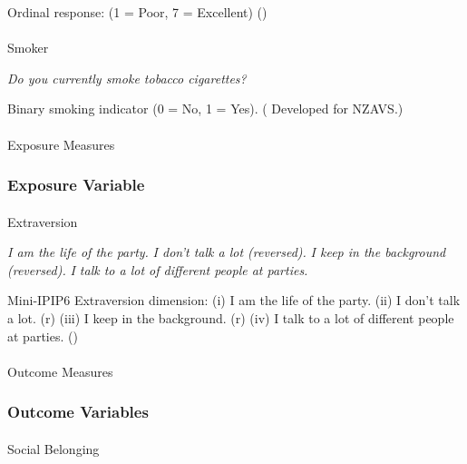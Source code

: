 \documentclass[
  single column]{article}
\makeatletter
\let\oldparagraph\paragraph
\renewcommand{\paragraph}{
    \@ifstar
      \xxxParagraphStar
      \xxxParagraphNoStar
  }
\newcommand{\xxxParagraphStar}[1]{\oldparagraph*{#1}\mbox{}}
\newcommand{\xxxParagraphNoStar}[1]{\oldparagraph{#1}\mbox{}}
\makeatother
\begin{document}
Ordinal response: (1 = Poor, 7 = Excellent)
()

\paragraph{Smoker}\label{smoker}

\emph{Do you currently smoke tobacco cigarettes?}

Binary smoking indicator (0 = No, 1 = Yes).
( Developed for NZAVS.)

\paragraph{Exposure Measures}\label{exposure-measures}

\subsubsection{Exposure Variable}\label{exposure-variable}

\paragraph{Extraversion}\label{extraversion}

\emph{I am the life of the party.} \emph{I don't talk a lot (reversed).}
\emph{I keep in the background (reversed).} \emph{I talk to a lot of
different people at parties.}

Mini-IPIP6 Extraversion dimension: (i) I am the life of the party. (ii)
I don't talk a lot. (r) (iii) I keep in the background. (r) (iv) I talk
to a lot of different people at parties.
()

\paragraph{Outcome Measures}\label{outcome-measures}

\subsubsection{Outcome Variables}\label{outcome-variables}

\paragraph{Social Belonging}\label{social-belonging-1}
\end{document}
